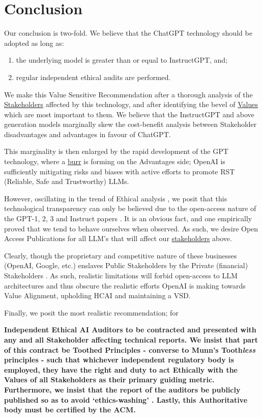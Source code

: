 \newpage
\section{Conclusion}
\enlargethispage{2cm}

Our conclusion is two-fold. We believe that the ChatGPT technology should be adopted as long as:
\begin{enumerate}[itemsep=0pt, topsep=0pt]
\item the underlying model is greater than or equal to InstructGPT, and;
\item regular independent ethical audits are performed. 
\end{enumerate}

We make this Value Sensitive Recommendation after a thorough analysis of the \hyperlink{section.2}{Stakeholders} affected by this technology, and after identifying the bevel of \hyperlink{section.3}{Values} which are most important to them. We believe that the InstructGPT and above generation models marginally skew the cost-benefit analysis between Stakeholder disadvantages and advantages in favour of ChatGPT.

This marginality is then enlarged by the rapid development of the GPT technology, where a \hyperlink{section.4}{burr} is forming on the Advantages side; OpenAI is sufficiently mitigating risks and biases with active efforts to promote RST (Reliable, Safe and Trustworthy) LLMs.

However, oscillating in the trend of Ethical analysis \parencite{munn2023uselessness}, we posit that this technological transparency can only be believed due to the open-access nature of the GPT-1, 2, 3 and Instruct papers \parencite{gpt1,gpt2,gpt3,instructgpt}. It is an obvious fact, and one empirically proved \parencite{kahneman2011thinking} that we tend to behave ourselves when observed. As such, we desire Open Access Publications for all LLM's that will affect our \hyperlink{section.2}{stakeholders} above. 

Clearly, though the proprietary and competitive nature of these businesses (OpenAI, Google, etc.) enslaves Public Stakeholders by the Private (financial) Stakeholders \parencite{malizia2023xai}. As such, realistic limitations will forbid open-access to LLM architectures and thus obscure the realistic efforts OpenAI is making towards Value Alignment, upholding HCAI and maintaining a VSD. 

Finally, we posit the most realistic recommendation; for
\begin{tcolorbox}[colback=white,colframe=purple,sharp corners]
\textbf{Independent Ethical AI Auditors to be contracted and presented with any and all Stakeholder affecting technical reports. We insist that part of this contract be Toothed Principles - converse to Munn's Tooth\emph{less} principles - such that whichever independent regulatory body is employed, they have the right and duty to act Ethically with the Values of all Stakeholders as their primary guiding metric. Furthermore, we insist that the report of the auditors be publicly published so as to avoid `ethics-washing' \parencite{bietti2020ethics}. Lastly, this Authoritative body must be certified by the ACM.}
\end{tcolorbox}

